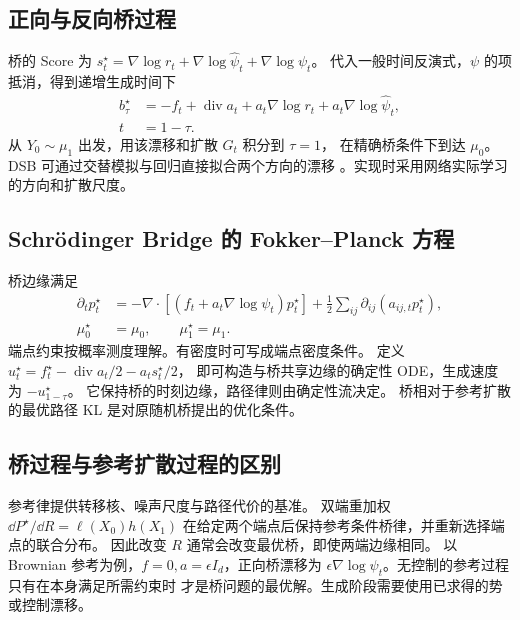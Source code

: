 \subsection{正向与反向桥过程}

桥的 Score 为 \(s_t^\star=\nabla\log r_t+
\nabla\log\widehat\psi_t+\nabla\log\psi_t\)。
代入一般时间反演式，\(\psi\) 的项抵消，得到递增生成时间下
\begin{equation}
 \begin{aligned}
 b_\tau^\star&=-f_t+\operatorname{div}a_t+a_t\nabla\log r_t
                       +a_t\nabla\log\widehat\psi_t,\\
 t&=1-\tau.
 \end{aligned}
 \label{eq:generation-sb-backward}
\end{equation}
从 \(Y_0\sim\mu_1\) 出发，用该漂移和扩散 \(G_t\) 积分到 \(\tau=1\)，
在精确桥条件下到达 \(\mu_0\)。
DSB 可通过交替模拟与回归直接拟合两个方向的漂移
\cite{debortoli2021dsb}。实现时采用网络实际学习的方向和扩散尺度。

\subsection{Schrödinger Bridge 的 Fokker--Planck 方程}

桥边缘满足
\begin{equation}
 \begin{aligned}
 \partial_t p_t^\star&=-\nabla\cdot[(f_t+a_t\nabla\log\psi_t)p_t^\star]
                  +\tfrac12\sum_{ij}\partial_{ij}(a_{ij,t}p_t^\star),\\
 \mu_0^\star&=\mu_0,\qquad \mu_1^\star=\mu_1.
 \end{aligned}
 \label{eq:generation-sb-fp}
\end{equation}
端点约束按概率测度理解。有密度时可写成端点密度条件。
定义 \(u_t^\star=f_t^\star-\operatorname{div}a_t/2-a_ts_t^\star/2\)，
即可构造与桥共享边缘的确定性 ODE，生成速度为 \(-u_{1-\tau}^\star\)。
它保持桥的时刻边缘，路径律则由确定性流决定。
桥相对于参考扩散的最优路径 KL 是对原随机桥提出的优化条件。

\subsection{桥过程与参考扩散过程的区别}

参考律提供转移核、噪声尺度与路径代价的基准。
双端重加权 \(\dd P^\star/\dd R=\ell(X_0)h(X_1)\)
在给定两个端点后保持参考条件桥律，并重新选择端点的联合分布。
因此改变 \(R\) 通常会改变最优桥，即使两端边缘相同。
以 Brownian 参考为例，\(f=0,a=\epsilon I_d\)，正向桥漂移为
\(\epsilon\nabla\log\psi_t\)。无控制的参考过程只有在本身满足所需约束时
才是桥问题的最优解。生成阶段需要使用已求得的势或控制漂移。

